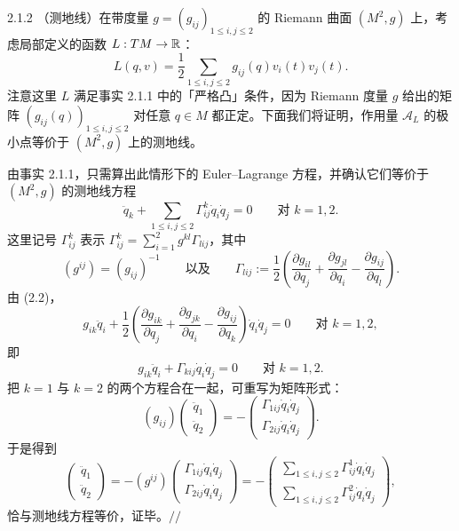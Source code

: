 \begin{wexam}{2.1.2}
（测地线）在带度量 $g=(g_{ij})_{1\le i,j\le2}$ 的 Riemann 曲面 $(M^2,g)$ 上，考虑局部定义的函数 $L:TM\to\mathbb{R}$：
\[
  L(q,v)=\frac12\sum_{1\le i,j\le2}g_{ij}(q)v_i(t)v_j(t).
\]
注意这里 $L$ 满足事实 2.1.1 中的「严格凸」条件，因为 Riemann 度量 $g$ 给出的矩阵 $(g_{ij}(q))_{1\le i,j\le2}$ 对任意 $q\in M$ 都正定。下面我们将证明，作用量 $\mathcal{A}_L$ 的极小点等价于 $(M^2,g)$ 上的测地线。

由事实 2.1.1，只需算出此情形下的 Euler--Lagrange 方程，并确认它们等价于 $(M^2,g)$ 的测地线方程
\[
  \ddot q_k+\sum_{1\le i,j\le2}\Gamma^k_{ij}\dot q_i\dot q_j=0
  \qquad\text{对 } k=1,2 .
\]
这里记号 $\Gamma^k_{ij}$ 表示 $\Gamma^k_{ij}=\sum_{i=1}^2g^{kl}\Gamma_{lij}$，其中
\[
  (g^{ij})=(g_{ij})^{-1}
  \qquad\text{以及}\qquad
  \Gamma_{lij}:=\frac12\left(\frac{\partial g_{il}}{\partial q_j}
  +\frac{\partial g_{jl}}{\partial q_i}-\frac{\partial g_{ij}}{\partial q_l}\right).
\]
由 (2.2)，
\[
  g_{ik}\ddot q_i+\frac12\left(\frac{\partial g_{ik}}{\partial q_j}
  +\frac{\partial g_{jk}}{\partial q_i}-\frac{\partial g_{ij}}{\partial q_k}\right)\dot q_i\dot q_j=0
  \qquad\text{对 } k=1,2,
\]
即
\[
  g_{ik}\ddot q_i+\Gamma_{kij}\dot q_i\dot q_j=0\qquad\text{对 } k=1,2 .
\]
把 $k=1$ 与 $k=2$ 的两个方程合在一起，可重写为矩阵形式：
\[
  (g_{ij})\begin{pmatrix}\ddot q_1\\ \ddot q_2\end{pmatrix}
  =-\begin{pmatrix}\Gamma_{1ij}\dot q_i\dot q_j\\ \Gamma_{2ij}\dot q_i\dot q_j\end{pmatrix}.
\]
于是得到
\[
  \begin{pmatrix}\ddot q_1\\ \ddot q_2\end{pmatrix}
  =-(g^{ij})\begin{pmatrix}\Gamma_{1ij}\dot q_i\dot q_j\\ \Gamma_{2ij}\dot q_i\dot q_j\end{pmatrix}
  =-\begin{pmatrix}\sum_{1\le i,j\le2}\Gamma^1_{ij}\dot q_i\dot q_j\\[1mm]
  \sum_{1\le i,j\le2}\Gamma^2_{ij}\dot q_i\dot q_j\end{pmatrix},
\]
恰与测地线方程等价，证毕。\hfill$//$
\end{wexam}
